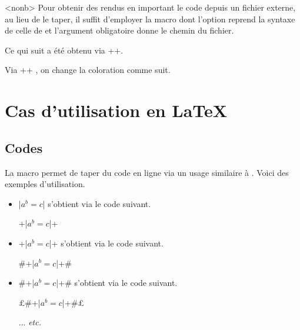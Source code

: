 \begin{bdocexa}<nonb>
    Pour obtenir des rendus en important le code depuis un fichier externe, au lieu de le taper, il suffit d'employer la macro  dont l'option reprend la syntaxe de celle de  et l'argument obligatoire donne le chemin du fichier.

    \medskip

    Ce qui suit a été obtenu via \bdocinlatex++.

    \medskip


    \medskip

    Via \bdocinlatex++ , on change la coloration comme suit.

    \medskip

\end{bdocexa}


\section{Cas d'utilisation en \LaTeX}

\subsection{Codes }

La macro  permet de taper du code en ligne via un usage similaire à .
Voici des exemples d'utilisation.
\begin{itemize}
    \item \bdocinlatex|$a^b = c$| s'obtient via le code suivant.
		  \begin{center}
		  		\bdocinlatex+\bdocinlatex|$a^b = c$|+
		  \end{center}


    \item \bdocinlatex+\bdocinlatex|$a^b = c$|+ s'obtient via le code suivant.
		  \begin{center}
		  		\bdocinlatex#\bdocinlatex+\bdocinlatex|$a^b = c$|+#
		  \end{center}


    \item \bdocinlatex#\bdocinlatex+\bdocinlatex|$a^b = c$|+# s'obtient via le code suivant.
		  \begin{center}
		  		\bdocinlatex£\bdocinlatex#\bdocinlatex+\bdocinlatex|$a^b = c$|+#£

				\medskip

				... \emph{etc.}
		  \end{center}
\end{itemize}


